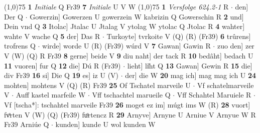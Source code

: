 \documentclass[8pt,a4paper,notitlepage]{article}
\begin{document}
\begin{table}[ht]
\begin{minipage}[t]{0.5\linewidth}
\line(1,0){75} \newline
\textbf{1} \textit{Initiale} Q Fr39  \textbf{7} \textit{Initiale} U V W  \newline
\line(1,0){75} \newline
\textbf{1} \textit{Versfolge 624.2-1} R   $\cdot$ den] Der Q  $\cdot$ Gowerzin] Gowerzen U gowerzein W kabrizin Q Gowerschin R \textbf{2} und] Dein vnd Q \textbf{3} Itolac] Jtalac U Jtalag V ytolag W ytolac Q Jtolac R \textbf{4} wahter] wahte V wache Q \textbf{5} der] Das R  $\cdot$ Turkoyte] tvrkoite V (Q) (R) (Fr39) \textbf{6} trûrens] trofrens Q  $\cdot$ wirde] worde U (R) (Fr39) wúrd V \textbf{7} Gawan] Gawin R  $\cdot$ zuo den] zer V (W) (Q) R Fr39 \textbf{8} gerne] beide V \textbf{9} diu naht] der tack R \textbf{10} bedâht] bedach U \textbf{11} vuoren] fur Q \textbf{12} die] Dú R (Fr39)  $\cdot$ lieht] li͑ht Q \textbf{13} Gawan] Gewin R \textbf{15} die] div Fr39 \textbf{16} si] Die Q \textbf{19} es] iz U (V)  $\cdot$ der] die W \textbf{20} mag ich] mag mag ich U \textbf{24} mohten] mohtens V (Q) (R) Fr39 \textbf{25} Of Tschatel marveile U  $\cdot$ Vf schatelmarveile V  $\cdot$ Auff kastel marfeile W  $\cdot$ Vff tschachtel marueile Q  $\cdot$ Vff Schahtel Maruiele R  $\cdot$ Vf [tscha*]: tschahtel marveile Fr39 \textbf{26} moget ez im] múgt ims W (R) \textbf{28} vuort] fvͦrten V (W) (Q) (Fr39) fuͦrtencz R \textbf{29} Arnyve] Arnyne U Arniue V Arnyue W R Fr39 Arniúe Q  $\cdot$ kunden] kunde U wol kunden W \newline
\end{minipage}
\end{table}
\end{document}
